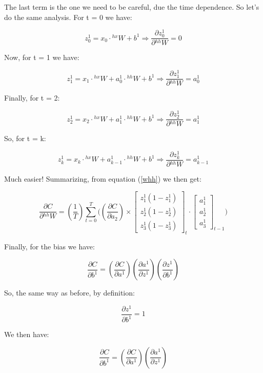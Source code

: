 \documentclass[12pt]{article}
\begin{document}
The last term is the one we need to be careful, due the time dependence. So let's do the same analysis. For t = 0 we have:

\[
z^{1}_{0}
=
x_{0} \cdot {}^{hx}W + b^{1}
\Rightarrow
\dfrac{\partial z^{1}_{0}}{\partial {}^{hh}W} = 0
\]

Now, for t = 1 we have:


\[
z^{1}_{1}
=
x_{1} \cdot {}^{hx}W + a^{1}_{0} \cdot {}^{hh}W +  b^{1}
\Rightarrow
\dfrac{\partial z^{1}_{1}}{\partial {}^{hh}W} 
=
a^{1}_{0}
\]

Finally, for t = 2:

\[
z^{1}_{2}
=
x_{2} \cdot {}^{hx}W + a^{1}_{1} \cdot {}^{hh}W +  b^{1}
\Rightarrow
\dfrac{\partial z^{1}_{2}}{\partial {}^{hh}W} = a^{1}_{1}
\]

So, for t = k:

\[
z^{1}_{k}
=
x_{k} \cdot {}^{hx}W + a^{1}_{k-1} \cdot {}^{hh}W +  b^{1}
\Rightarrow
\dfrac{\partial z^{1}_{k}}{\partial {}^{hh}W} = a^{1}_{k-1}
\]


Much easier! Summarizing, from equation (\ref{whh}) we then get:


\[
\dfrac{\partial C}{\partial {}^{hh}W}
=
(\dfrac{1}{T}) \sum_{t=0}^{T} 
\Bigg(
\left( \dfrac{\partial C}{\partial a_{2}}\right)
\times 
\begin{bmatrix}
z_{1}^{1}(1 - z_{1}^{1})\\
z_{2}^{1}(1 - z_{2}^{1})\\
z_{3}^{1}(1 - z_{3}^{1})
\end{bmatrix}_{t}
\cdot
\begin{bmatrix}
a_{1}^{1}\\
a_{2}^{1}\\
a_{3}^{1}
\end{bmatrix}_{t-1}
\Bigg)
\]

Finally, for the bias we have:

\begin{equation}
    \dfrac{\partial C}{\partial b^{1}} = \left( \dfrac{\partial C}{\partial a^{1}}\right) \left( \dfrac{\partial a^{1}}{\partial z^{1}}\right) \left(\dfrac{\partial z^{1}}{\partial b^{1}} \right)
\end{equation}

So, the same way as before, by definition:

\[
\dfrac{\partial z^{1}}{\partial b^{1}} = 1
\]

We then have:

\[
    \dfrac{\partial C}{\partial b^{1}} = \left( \dfrac{\partial C}{\partial a^{1}}\right) \left( \dfrac{\partial a^{1}}{\partial z^{1}}\right)
\]
\end{document}
